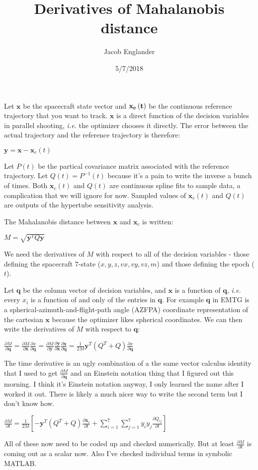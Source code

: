 \documentclass[12pt]{article}
\title{Derivatives of Mahalanobis distance}
\author{Jacob Englander}
\date{5/7/2018}
\begin{document}
\maketitle

Let $\mathbf{x}$ be the spacecraft state vector and $\bf{x}_c\left(t\right)$ be the continuous reference trajectory that you want to track. $\mathbf{x}$ is a direct function of the decision variables in parallel shooting, \textit{i.e.} the optimizer chooses it directly. The error between the actual trajectory and the reference trajectory is therefore:

$\mathbf{y} = \mathbf{x} - \mathbf{x}_c\left(t\right)$

Let $P\left(t\right)$ be the partical covariance matrix associated with the reference trajectory. Let $Q \left(t\right)= P^{-1}\left(t\right)$ because it's a pain to write the inverse a bunch of times. Both $\mathbf{x}_c\left(t\right)$ and $Q\left(t\right)$ are continuous spline fits to sample data, a complication that we will ignore for now. Sampled values of $\mathbf{x}_c\left(t\right)$ and $Q\left(t\right)$ are outputs of the hypertube sensitivity analysis.

The Mahalanobis distance between $\mathbf{x}$ and $\mathbf{x}_c$ is written:

$M = \sqrt{\mathbf{y}^T Q \mathbf{y}}$

We need the derivatives of $M$ with respect to all of the decision variables - those defining the spacecraft 7-state ($x, y, z, vx, vy, vz, m$) and those defining the epoch ($t$).

Let $\mathbf{q}$ be the column vector of decision variables, and $\mathbf{x}$ is a function of $\mathbf{q}$, \textit{i.e.} every $x_i$ is a function of and only of the entries in $\mathbf{q}$. For example $\mathbf{q}$ in EMTG is a spherical-azimuth-and-flight-path angle (AZFPA) coordinate representation of the cartesian $\mathbf{x}$ because the optimizer likes spherical coordinates. We can then write the derivatives of $M$ with respect to $\mathbf{q}$:

$\frac{\partial M}{\partial \mathbf{q}} = \frac{\partial M}{\partial \mathbf{x}}\frac{\partial x}{\partial \mathbf{q}} = \frac{\partial M}{\partial \mathbf{y}}\frac{\partial \mathbf{y}}{\partial \mathbf{x}}\frac{\partial \mathbf{x}}{\partial \mathbf{q}} = \frac{1}{2M}\mathbf{y}^T \left(Q^T + Q\right)\frac{\partial x}{\partial \mathbf{q}}$


The time derivative is an ugly combination of a the same vector calculus identity that I used to get $\frac{\partial M}{\partial \mathbf{q}}$ and an Einstein notation thing that I figured out this morning. I think it's Einstein notation anyway, I only learned the name after I worked it out. There is likely a much nicer way to write the second term but I don't know how.

$\frac{\partial M}{\partial t} = \frac{1}{2M} \left[-\mathbf{y}^T \left(Q^T + Q\right)\frac{\partial \mathbf{x}_c}{\partial t} + \sum_{i=1}^{7}\sum_{j=1}^{7}y_i y_j \frac{\partial Q_{ij}}{\partial t} \right]$

All of these now need to be coded up and checked numerically. But at least $\frac{\partial M}{\partial t}$ is coming out as a scalar now. Also I've checked individual terms in symbolic MATLAB.
\end{document}
